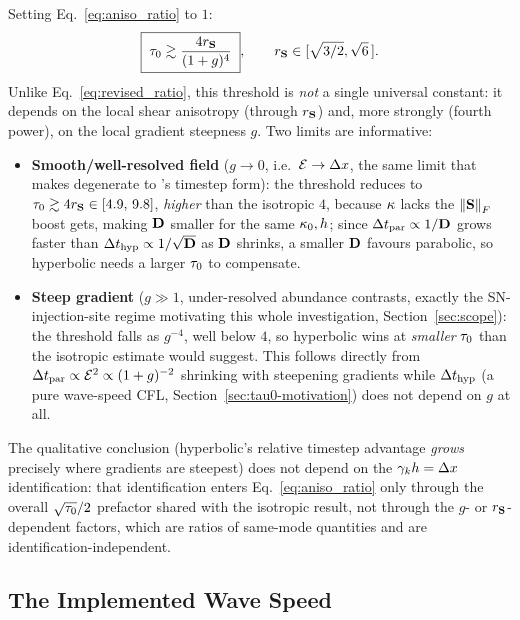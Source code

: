 Setting Eq.~\eqref{eq:aniso_ratio} to $1$:
\begin{equation}
  \label{eq:aniso_threshold}
  \boxed{\;\tau_0 \gtrsim \frac{4r_{\mathbf{S}}}{(1+g)^4}\;} ,
  \qquad r_{\mathbf{S}}\in[\sqrt{3/2},\sqrt6\,] .
\end{equation}
Unlike Eq.~\eqref{eq:revised_ratio}, this threshold is \emph{not} a
single universal constant: it depends on the local shear anisotropy
(through $r_{\mathbf{S}}$) and, more strongly (fourth power), on the local gradient
steepness $g$. Two limits are informative:
\begin{itemize}
\item \textbf{Smooth/well-resolved field} ($g\to0$, i.e.\
  $\mathcal{E}\to\Delta x$, the same limit that makes
   degenerate to
  's timestep form): the threshold reduces to
  $\tau_0\gtrsim4r_{\mathbf{S}}\in[4.9,\,9.8]$, \emph{higher} than the isotropic
  $4$, because $\kappa$ lacks the $\norm{\mathbf{S}}_F$ boost
   gets, making $\mathbf{D}$ smaller for the same
  $\kappa_{0},h$; since $\Delta t_{\rm par}\propto1/\mathbf{D}$ grows faster than
  $\Delta t_{\rm hyp}\propto1/\sqrt{\mathbf{D}}$ as $\mathbf{D}$ shrinks, a smaller
  $\mathbf{D}$ favours parabolic, so hyperbolic needs a larger $\tau_0$ to
  compensate.
\item \textbf{Steep gradient} ($g\gg1$, under-resolved abundance
  contrasts, exactly the SN-injection-site regime motivating this whole
  investigation, Section~\ref{sec:scope}): the threshold falls as
  $g^{-4}$, well below $4$, so hyperbolic wins at \emph{smaller}
  $\tau_0$ than the isotropic estimate would suggest. This follows
  directly from $\Delta t_{\rm par}\propto\mathcal{E}^2\propto(1+g)^{-2}$ shrinking
  with steepening gradients while $\Delta t_{\rm hyp}$ (a pure wave-speed CFL,
  Section~\ref{sec:tau0-motivation}) does not depend on $g$ at all.
\end{itemize}
The qualitative conclusion (hyperbolic's relative timestep advantage
\emph{grows} precisely where gradients are steepest) does not depend on
the $\gamma_{k} h=\Delta x$ identification: that identification enters
Eq.~\eqref{eq:aniso_ratio} only through the overall
$\sqrt{\tau_0}/2$ prefactor shared with the isotropic result, not
through the $g$- or $r_{\mathbf{S}}$-dependent factors, which are ratios of
same-mode quantities and are identification-independent.

\subsection{The Implemented Wave Speed}
\label{sec:confrontation}

